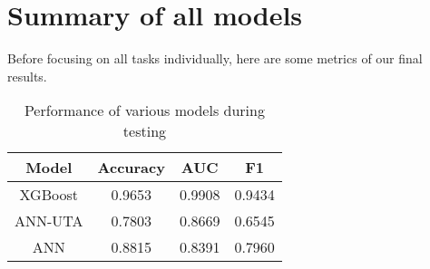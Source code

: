 \documentclass[../main.tex]{subfiles}
\begin{document}
\section{Summary of all models}
Before focusing on all tasks individually, here are some metrics of our final
results.

\begin{table}[H]
	\begin{center}
		\begin{tabular}{c||c|c|c}
			\hline
			Model & Accuracy & AUC & F1 \\
			\hline
			\hline
			XGBoost & 0.9653 & 0.9908 & 0.9434 \\
			ANN-UTA & 0.7803 & 0.8669 & 0.6545 \\
			ANN     & 0.8815 & 0.8391 & 0.7960 \\
			\hline
		\end{tabular}
		\caption{Performance of various models during testing}
		\label{table:perf}
	\end{center}
\end{table}
\end{document}
